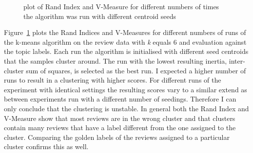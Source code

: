 \documentclass[11pt]{article}
\begin{document}
\begin{figure}
  \caption{plot of Rand Index and V-Measure for different numbers of times the algorithm was run with different centroid seeds}
  \label{fig:k-seeds}
\end{figure}

Figure~\ref{fig:k-seeds} plots the Rand Indices and V-Measures for different numbers of runs of the k-means algorithm on the review data with \emph{k} equals 6 and evaluation against the topic labels. Each run the algorithm is initialised with different seed centroids that the samples cluster around. The run with the lowest resulting inertia, inter-cluster sum of squares, is selected as the best run. I expected a higher number of runs to result in a clustering with higher scores. For different runs of the experiment with identical settings the resulting scores vary to a similar extend as between experiments run with a different number of seedings. Therefore I can only conclude that the clustering is unstable. In general both the Rand Index and V-Measure show that most reviews are in the wrong cluster and that clusters contain many reviews that have a label different from the one assigned to the cluster. Comparing the golden labels of the reviews assigned to a particular cluster confirms this as well.
\end{document}
